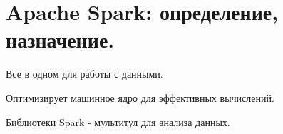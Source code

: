 \section{Apache Spark: определение, назначение.}


Все в одном для работы с данными.

Оптимизирует машинное ядро для эффективных вычислений.

Библиотеки Spark - мультитул для анализа данных.
